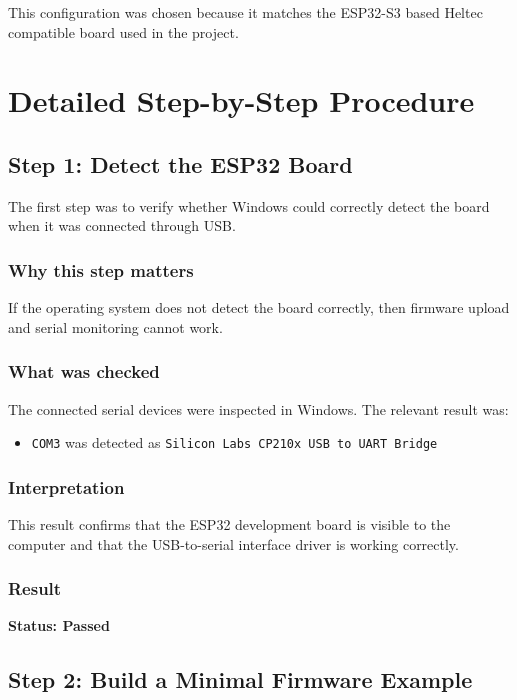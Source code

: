 \documentclass[12pt,a4paper]{article}
\begin{document}
This configuration was chosen because it matches the ESP32-S3 based Heltec
compatible board used in the project.

\section{Detailed Step-by-Step Procedure}

\subsection{Step 1: Detect the ESP32 Board}

The first step was to verify whether Windows could correctly detect the board
when it was connected through USB.

\subsubsection*{Why this step matters}

If the operating system does not detect the board correctly, then firmware
upload and serial monitoring cannot work.

\subsubsection*{What was checked}

The connected serial devices were inspected in Windows. The relevant result was:

\begin{itemize}
    \item \texttt{COM3} was detected as \texttt{Silicon Labs CP210x USB to UART Bridge}
\end{itemize}

\subsubsection*{Interpretation}

This result confirms that the ESP32 development board is visible to the
computer and that the USB-to-serial interface driver is working correctly.

\subsubsection*{Result}

\textbf{Status: Passed}

\subsection{Step 2: Build a Minimal Firmware Example}
\end{document}
